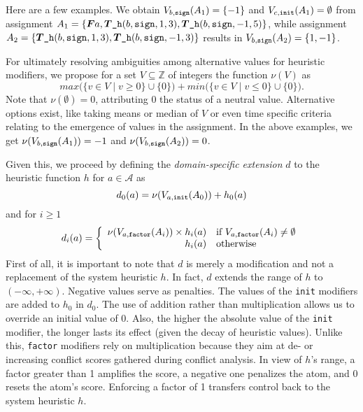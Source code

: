 Here are a few examples.
We obtain %
$V_{b,\mathtt{sign}}(A_1)=\{-1\}$
and
$V_{c,\mathtt{init}}(A_1)=\emptyset$
from assignment
\(
A_1=\{\boldsymbol{F}{a},\boldsymbol{T}{\texttt{\_h}(b,{\mathtt{sign}},1,3)},\boldsymbol{T}{\texttt{\_h}(b,{\mathtt{sign}},-1,5)}\}
\),
while assignment
\(
A_2=\{\boldsymbol{T}{\texttt{\_h}(b,{\mathtt{sign}},1,3)},\boldsymbol{T}{\texttt{\_h}(b,{\mathtt{sign}},-1,3)}\}
\)
results in $V_{b,\mathtt{sign}}(A_2)=\{1,-1\}$.

For ultimately resolving ambiguities among alternative values for heuristic modifiers, 
we propose for a set $V\subseteq\mathbb{Z}$ of integers the function $\nu(V)$ as
\[
\mathit{max}\big(\{v\in V\!\mid v\geq 0\}\cup\{0\}\big)
+
\mathit{min}\big(\{v\in V\!\mid v\leq 0\}\cup\{0\}\big).
\]
Note that $\nu(\emptyset)=0$, attributing 0 the status of a neutral value.
Alternative options exist, like taking means or median of $V$ or even time specific criteria
relating to the emergence of values in the assignment.
%
In the above examples,
we get $\nu(V_{b,\mathtt{sign}}(A_1))=-1$ and $\nu(V_{b,\mathtt{sign}}(A_2))=0$.

Given this, we proceed by defining the \emph{domain-specific extension} $d$ to the heuristic function $h$ 
for $a\in\mathcal{A}$ as
\[
d_0(a)=\nu(V_{a,\mathtt{init}}(A_0))+h_0(a)
\]
and for $i\geq 1$
\[
d_i(a)=
\left\{
  \begin{array}{rl}
    \nu(V_{a,\mathtt{factor}}(A_i))\times h_i(a)&\text{if } V_{a,\mathtt{factor}}(A_i)\neq\emptyset
    \\
                                             h_i(a)&\text{otherwise}
  \end{array}
\right.
\]
First of all, it is important to note that $d$ is merely a modification and not a replacement of the
system heuristic $h$.
In fact, $d$ extends the range of $h$ to $(-\infty,+\infty)$.
Negative values serve as penalties.
The values of the \texttt{init} modifiers are added to $h_0$ in $d_0$.
The use of addition rather than multiplication allows us to override an initial value of 0.
Also, the higher the absolute value of the \texttt{init} modifier, the longer lasts its effect
(given the decay of heuristic values).
Unlike this, \texttt{factor} modifiers rely on multiplication because they aim at de- or increasing
conflict scores gathered during conflict analysis.
In view of $h$'s range,
a factor greater than 1 amplifies the score, a negative one penalizes the atom, and 0 resets the atom's score.
Enforcing a factor of 1 
transfers control back to the system heuristic $h$.


